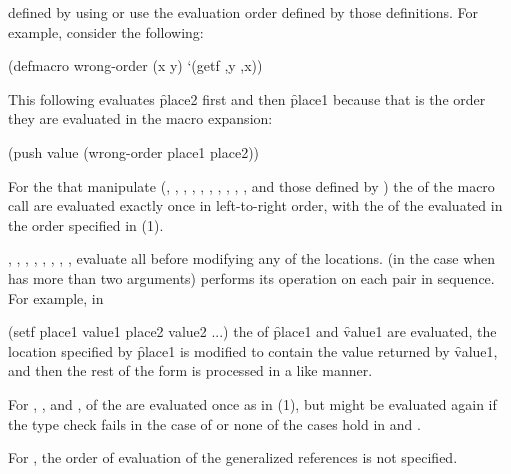  defined by using  or
use the evaluation order defined by those definitions.
For example, consider the following:

\code
 (defmacro wrong-order (x y) `(getf ,y ,x))
\endcode

This following  evaluates \f{place2} first and
then \f{place1} because that is the order they are evaluated in
the macro expansion:

\code
 (push value (wrong-order place1 place2))
\endcode

For the  that manipulate  
  (,
   ,
   ,
   ,
   , 
   ,
   ,
   ,
   ,
   , and those defined by )
the  of the macro call are evaluated exactly once
in left-to-right order, with the  of the 
evaluated in the order specified in (1).

, , , 
, , , , 
,  evaluate all  before modifying
any of the  locations.
 (in the case when  has more than two arguments) 
performs its operation on each pair in sequence. For example, in 

\code
 (setf place1 value1 place2 value2 ...)
\endcode
the  of \f{place1} and \f{value1} are evaluated, the location
specified by 
\f{place1} is modified to contain the value returned by 
\f{value1}, and
then the rest of the  form is processed in a like manner.

For , , and ,
 of the  are evaluated once as in (1),
but might be evaluated again if the
type check fails in the case of  
or none of the cases hold in
 and .

For , the order of evaluation of the generalized 
references is not specified.

